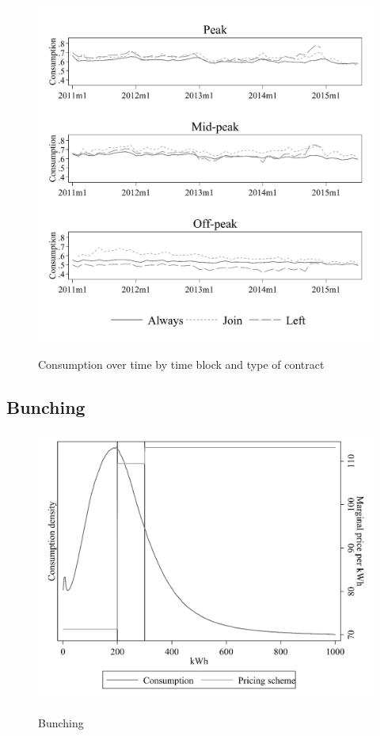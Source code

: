 \begin{figure}[ht]
  \caption{Consumption over time by time block and type of contract}\label{fig:eightteen}
  \begin{center}
  {\includegraphics[width=1\textwidth]{./figures/image18.png}}
  \end{center}
\end{figure}

\FloatBarrier

\clearpage

\subsection{Bunching}\label{appendix:F}

\begin{figure}[ht]
  \caption{Bunching}\label{fig:nineteen}
  \begin{center}
  {\includegraphics[width=1\textwidth]{./figures/image19.png}}
  \end{center}
\end{figure}

\FloatBarrier
